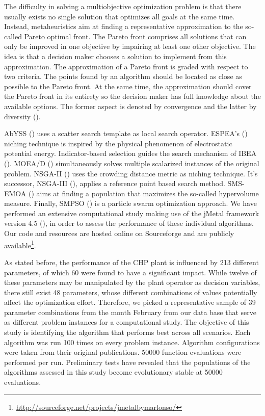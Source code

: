 The difficulty in solving a multiobjective optimization problem is that there usually exists no single solution that optimizes all goals at the same time. Instead, metaheuristics aim at finding a representative approximation to the so-called Pareto optimal front. The Pareto front comprises all solutions that can only be improved in one objective by impairing at least one other objective. The idea is that a decision maker chooses a solution to implement from this approximation. The approximation of a Pareto front is graded with respect to two criteria. The points found by an algorithm should be located as close as possible to the Pareto front. At the same time, the approximation should cover the Pareto front in its entirety so the decision maker has full knowledge about the available options. The former aspect is denoted by convergence and the latter by diversity (\cite{basicDeb,basicCoello}).

AbYSS (\cite{abyss}) uses a scatter search template as local search operator. ESPEA's (\cite{espea}) niching technique is inspired by the physical phenomenon of electrostatic potential energy. Indicator-based selection guides the search mechanism of IBEA (\cite{ibea}). MOEA/D (\cite{moead2009}) simultaneously solves multiple scalarized instances of the original problem. NSGA-II (\cite{nsga2}) uses the crowding distance metric as niching technique. It's successor, NSGA-III (\cite{nsga3part1}), applies a reference point based search method. SMS-EMOA (\cite{smsemoa}) aims at finding a population that maximizes the so-called hypervolume measure. Finally, SMPSO (\cite{smpso}) is a particle swarm optimization approach. We have performed an extensive computational study making use of the jMetal framework version 4.5 (\cite{jmetal2}), in order to assess the performance of these individual algorithms. Our code and resources are hosted online on Sourceforge and are publicly available\footnote{\url{http://sourceforge.net/projects/jmetalbymarlonso/}}.

As stated before, the performance of the CHP plant is influenced by 213 different parameters, of which 60 were found to have a significant impact. While twelve of these parameters may be manipulated by the plant operator as decision variables, there still exist 48 parameters, whose different combinations of values potentially affect the optimization effort. Therefore, we picked a representative sample of 39 parameter combinations from the month February from our data base that serve as different problem instances for a computational study. The objective of this study is identifying the algorithm that performs best across all scenarios. Each algorithm was run 100 times on every problem instance. Algorithm configurations were taken from their original publications. \num{50000} function evaluations were performed per run. Preliminary tests have revealed that the populations of the algorithms assessed in this study become evolutionary stable at \num{50000} evaluations.


